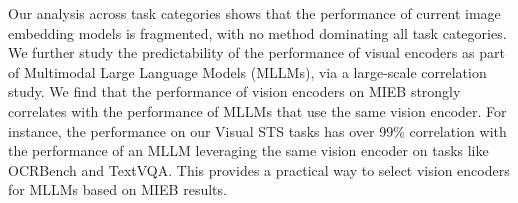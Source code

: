 Our analysis across task categories shows that the performance of current image embedding models is fragmented, with no method dominating all task categories. We further study the predictability of the performance of visual encoders as part of Multimodal Large Language Models (MLLMs), via a large-scale correlation study. We find that the performance of vision encoders on MIEB strongly correlates with the performance of MLLMs that use the same vision encoder. For instance, the performance on our Visual STS tasks has over 99\% correlation with the performance of an MLLM leveraging the same vision encoder on tasks like OCRBench and TextVQA. This provides a practical way to select vision encoders for MLLMs based on MIEB results.
